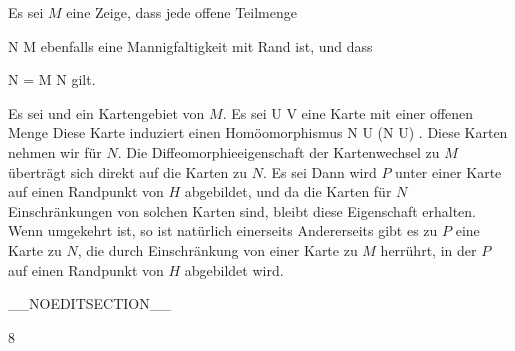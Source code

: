 {

Es sei $M$ eine
Zeige, dass jede offene Teilmenge

\mavergleichskette
{\vergleichskette
{ N
}
{ \subseteq }{ M
}
{  }{
}
{    }{
}
{   }{
}
}
{}{}{}
ebenfalls eine Mannigfaltigkeit mit
 {} {}
Rand ist, und dass

\mavergleichskettedisp
{\vergleichskette
{ \partial N
}
{ =} { \partial M \cap N
}
{ } {
}
{ } {
}
{ } {
}
}
{}{}{}
gilt.

}
{

Es sei
 und
 ein Kartengebiet von $M$. Es sei
\maabbdisp {\alpha} { U } {V
} {}
eine Karte mit einer offenen Menge
 Diese Karte induziert einen Homöomorphismus
\maabbdisp {} {N \cap U} { \alpha (N \cap U)
} {.}
Diese Karten nehmen wir für $N$. Die Diffeomorphieeigenschaft der Kartenwechsel zu $M$ überträgt sich direkt auf die Karten zu $N$. Es sei
 Dann wird $P$ unter einer Karte auf einen Randpunkt von $H$ abgebildet, und da die Karten für $N$ Einschränkungen von solchen Karten sind, bleibt diese Eigenschaft erhalten. Wenn umgekehrt
 ist, so ist natürlich einerseits
 Andererseits gibt es zu $P$ eine Karte zu $N$, die durch Einschränkung von einer Karte zu $M$ herrührt, in der $P$ auf einen Randpunkt von $H$ abgebildet wird.

 }

__NOEDITSECTION__

{8}

